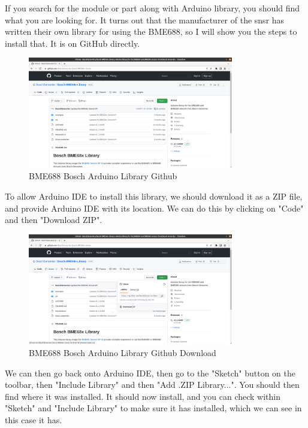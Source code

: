 \documentclass[a4paper,11pt]{report}
\begin{document}
If you search for the module or part along with Arduino library, you should find what you are looking for. It turns out that the manufacturer of the \gls{snsr} has written their own library for using the BME688, so I will show you the steps to install that. It is on GitHub directly.

\begin{figure}[H]
\centering
\includegraphics[width=0.8\textwidth]{screenshots/boscharduinolibrarygithub}
\caption{BME688 Bosch Arduino Library Github}
\end{figure}

To allow Arduino IDE to install this library, we should download it as a ZIP file, and provide Arduino IDE with its location. We can do this by clicking on "Code" and then "Download ZIP".

\begin{figure}[H]
\centering
\includegraphics[width=0.8\textwidth]{screenshots/boscharduinolibrarygithubdownload}
\caption{BME688 Bosch Arduino Library Github Download}
\end{figure}

We can then go back onto Arduino IDE, then go to the "Sketch" button on the toolbar, then "Include Library" and then "Add .ZIP Library...". You should then find where it was installed. It should now install, and you can check within "Sketch" and "Include Library" to make sure it has installed, which we can see in this case it has.
\end{document}
